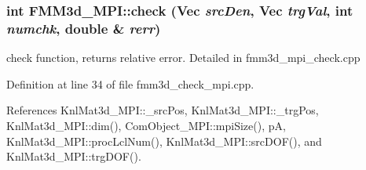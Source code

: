 \subsubsection{\setlength{\rightskip}{0pt plus 5cm}int FMM3d\_\-MPI::check (Vec {\em src\-Den}, Vec {\em trg\-Val}, int {\em numchk}, double \& {\em rerr})}\label{classFMM3d__MPI_d2aa9de21b49559ceb1eb86a90536758_d2aa9de21b49559ceb1eb86a90536758}


check function, returns relative error. Detailed in fmm3d\_\-mpi\_\-check.cpp 

Definition at line 34 of file fmm3d\_\-check\_\-mpi.cpp.

References Knl\-Mat3d\_\-MPI::\_\-src\-Pos, Knl\-Mat3d\_\-MPI::\_\-trg\-Pos, Knl\-Mat3d\_\-MPI::dim(), Com\-Object\_\-MPI::mpi\-Size(), p\-A, Knl\-Mat3d\_\-MPI::proc\-Lcl\-Num(), Knl\-Mat3d\_\-MPI::src\-DOF(), and Knl\-Mat3d\_\-MPI::trg\-DOF().

